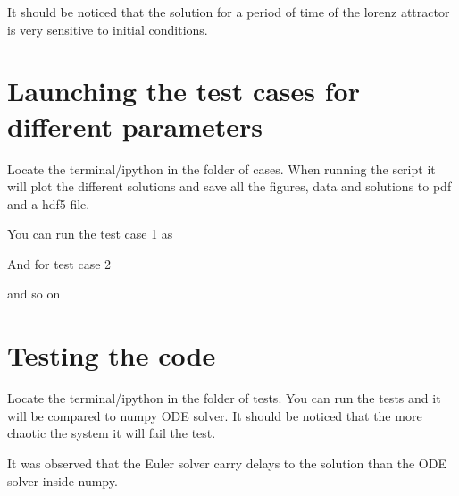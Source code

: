 \documentclass[letterpaper,10pt,english]{sphinxmanual}
\begin{document}
It should be noticed that the solution for a period of time of the lorenz attractor is very sensitive to initial conditions.


\chapter{Launching the test cases for different parameters}
\label{\detokenize{index:launching-the-test-cases-for-different-parameters}}
Locate the terminal/ipython in the folder of cases. When running the script it will plot the different solutions and save all the figures, data and solutions to pdf and a hdf5 file.

You can run the test case 1 as

\begin{sphinxVerbatim}[commandchars=\\\{\}]
 
\end{sphinxVerbatim}

And for test case 2

\begin{sphinxVerbatim}[commandchars=\\\{\}]
 
\end{sphinxVerbatim}

and so on

\begin{sphinxVerbatim}[commandchars=\\\{\}]
 
 
 
\end{sphinxVerbatim}


\chapter{Testing the code}
\label{\detokenize{index:testing-the-code}}
Locate the terminal/ipython in the folder of tests. You can run the tests and it will be compared to numpy ODE solver. It should be noticed that the more chaotic the system it will fail the test.

It was observed that the Euler solver carry delays to the solution than the ODE solver inside numpy.
\end{document}
